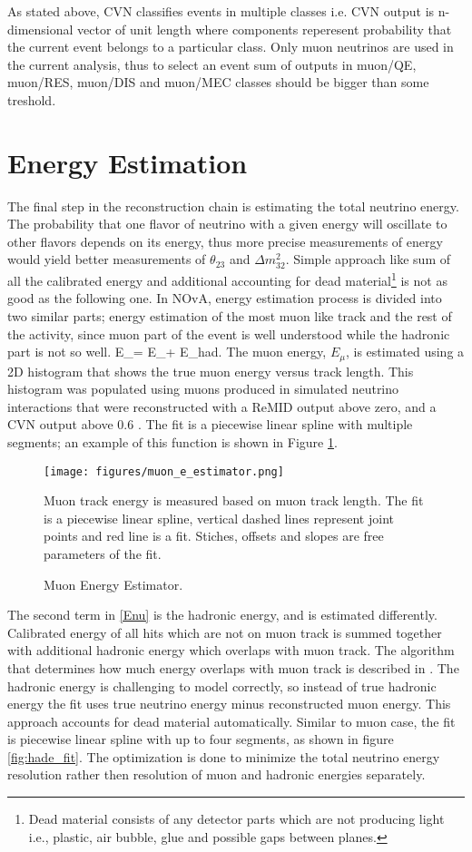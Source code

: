 As stated above, CVN classifies events in multiple classes i.e. CVN output is n-dimensional vector of unit length
where components reperesent probability that the current event belongs to a particular class. Only muon neutrinos
are used in the current analysis, thus to select an event sum of outputs in muon/QE, muon/RES, muon/DIS and 
muon/MEC classes should be bigger than some treshold.

\section{Energy Estimation} \label{energy_est_cont}
The final step in the reconstruction chain is estimating the total neutrino energy. The probability that one
flavor of neutrino with a given energy will oscillate to other flavors depends on its energy, thus more
precise measurements of energy would yield better measurements of $\theta_{23}$ and $\Delta m_{32}^2$.
Simple approach like sum of all the calibrated energy and additional accounting for dead 
material\footnote{Dead material consists of any detector parts which are not producing light i.e., plastic, air 
bubble, glue and possible gaps between planes.} is not as good as the following one. In NOvA, energy estimation 
process is divided into two similar parts; energy estimation of the most muon like track and the rest of the 
activity, since muon part of the event is well understood while the hadronic part is not so well.
\be
E_\nu = E_\mu + E_{had}.
\ee 
The muon energy, $E_{\mu}$, is estimated using a 2D histogram that shows the true muon energy versus track length.
This histogram was populated using muons produced in simulated neutrino interactions that were reconstructed with
a ReMID output above zero, and a CVN output above 0.6 \cite{energy_technote}. The fit is a piecewise linear spline
with multiple segments; an example of this function is shown in Figure \ref{fig:mue_fit}.
\begin{figure}[t]
\texttt{[image: figures/muon\_e\_estimator.png]}
\centering
\caption{Muon Energy Estimator.}
{Muon track energy is measured based on muon track length. The fit is a piecewise linear spline, vertical dashed
lines represent joint points and red line is a fit. Stiches, offsets and slopes are free parameters of the fit.}
\label{fig:mue_fit}
\end{figure}

The second term in \ref{Enu} is the hadronic energy, and is estimated differently. Calibrated energy of all hits 
which are not on muon track is summed together with additional hadronic energy which overlaps with muon track. 
The algorithm that determines how much energy overlaps with muon track is described in \cite{Kanika}. The hadronic
energy is challenging to model correctly, so instead of true hadronic energy the fit uses true neutrino energy minus
reconstructed muon energy. This approach accounts for dead material automatically. Similar to muon case, the fit 
is piecewise linear spline with up to four segments, as shown in figure \ref{fig:hade_fit}. The optimization is done
to minimize the total neutrino energy resolution rather then resolution of muon and hadronic energies separately. 

